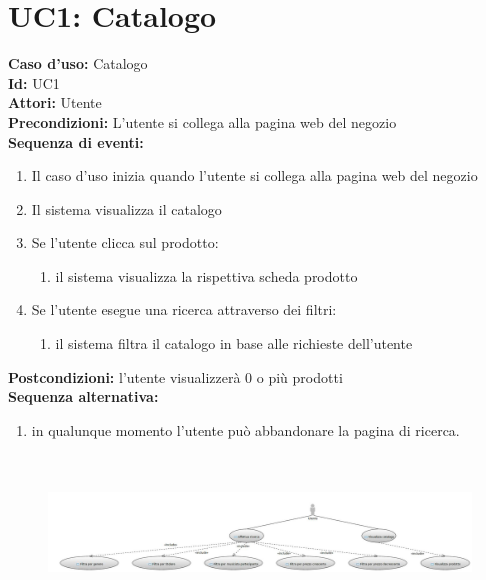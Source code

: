 \documentclass[a4paper,12pt]{report}
\begin{document}
	\section*{UC1: Catalogo}
	\noindent
	\textbf{Caso d'uso:} Catalogo\\
	\textbf{Id:} UC1\\
	\textbf{Attori:} Utente\\
	\textbf{Precondizioni:} L'utente si collega alla pagina web del negozio\\
	\textbf{Sequenza di eventi:}
	\begin{enumerate} 
		\item Il caso d'uso inizia quando l'utente si collega alla pagina web del negozio
		\item Il sistema visualizza il catalogo
		\item Se l'utente clicca sul prodotto:
		\begin{enumerate} 
			\item il sistema visualizza la rispettiva scheda prodotto
		\end{enumerate}
		\item Se l'utente esegue una ricerca attraverso dei filtri:
		\begin{enumerate}
			\item il sistema filtra il catalogo in base alle richieste dell'utente
		\end{enumerate}
		\end{enumerate}
	\textbf{Postcondizioni:} l'utente visualizzerà 0 o più prodotti\\
	\textbf{Sequenza alternativa:}
	\begin{enumerate}
		\item in qualunque momento l'utente può abbandonare la pagina di ricerca.
	\end{enumerate}

	\begin{figure}[h]
		\centering
		\includegraphics[width=\textwidth, height=4.104cm]{Catalogo}
	\end{figure}
\end{document}
